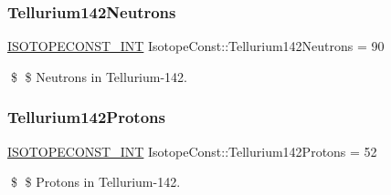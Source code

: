 \subsubsection{\texorpdfstring{Tellurium142\+Neutrons}{Tellurium142Neutrons}}
{\footnotesize\ttfamily \mbox{\hyperlink{group___isotope_const-_macros_ga5f18360b3e99483a35c32d789e62621c}{I\+S\+O\+T\+O\+P\+E\+C\+O\+N\+S\+T\+\_\+\+I\+NT}} Isotope\+Const\+::\+Tellurium142\+Neutrons = 90}

\$ \$ Neutrons in Tellurium-\/142. \mbox{\label{group___isotope_const-_tellurium-_te142_ga4cf2e67b69b33d52c6f02e1ae1527268}} 
\subsubsection{\texorpdfstring{Tellurium142\+Protons}{Tellurium142Protons}}
{\footnotesize\ttfamily \mbox{\hyperlink{group___isotope_const-_macros_ga5f18360b3e99483a35c32d789e62621c}{I\+S\+O\+T\+O\+P\+E\+C\+O\+N\+S\+T\+\_\+\+I\+NT}} Isotope\+Const\+::\+Tellurium142\+Protons = 52}

\$ \$ Protons in Tellurium-\/142. 